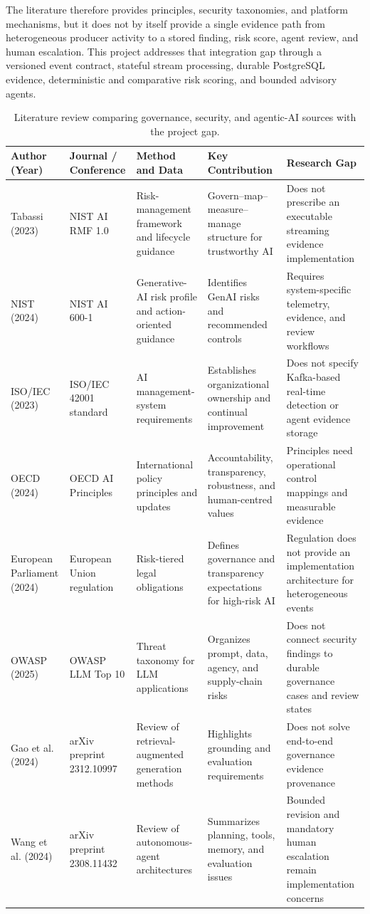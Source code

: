 \documentclass[12pt,oneside]{report}
\begin{document}
The literature therefore provides principles, security taxonomies, and platform mechanisms, but it does not by itself provide a single evidence path from heterogeneous producer activity to a stored finding, risk score, agent review, and human escalation. This project addresses that integration gap through a versioned event contract, stateful stream processing, durable PostgreSQL evidence, deterministic and comparative risk scoring, and bounded advisory agents.
\begin{table}[H]\centering\scriptsize\begin{tabular}{|p{2.2cm}|p{2.1cm}|p{2.35cm}|p{2.55cm}|p{2.35cm}|}\hline
\textbf{Author (Year)} & \textbf{Journal / Conference} & \textbf{Method and Data} & \textbf{Key Contribution} & \textbf{Research Gap}\\\hline
Tabassi (2023) \cite{nist2023} & NIST AI RMF 1.0 & Risk-management framework and lifecycle guidance & Govern--map--measure--manage structure for trustworthy AI & Does not prescribe an executable streaming evidence implementation\\\hline
NIST (2024) \cite{nistgenai2024} & NIST AI 600-1 & Generative-AI risk profile and action-oriented guidance & Identifies GenAI risks and recommended controls & Requires system-specific telemetry, evidence, and review workflows\\\hline
ISO/IEC (2023) \cite{iso42001} & ISO/IEC 42001 standard & AI management-system requirements & Establishes organizational ownership and continual improvement & Does not specify Kafka-based real-time detection or agent evidence storage\\\hline
OECD (2024) \cite{oecd2024} & OECD AI Principles & International policy principles and updates & Accountability, transparency, robustness, and human-centred values & Principles need operational control mappings and measurable evidence\\\hline
European Parliament (2024) \cite{euaiact2024} & European Union regulation & Risk-tiered legal obligations & Defines governance and transparency expectations for high-risk AI & Regulation does not provide an implementation architecture for heterogeneous events\\\hline
OWASP (2025) \cite{owasllm2025} & OWASP LLM Top 10 & Threat taxonomy for LLM applications & Organizes prompt, data, agency, and supply-chain risks & Does not connect security findings to durable governance cases and review states\\\hline
Gao et al. (2024) \cite{ragsurvey2024} & arXiv preprint 2312.10997 & Review of retrieval-augmented generation methods & Highlights grounding and evaluation requirements & Does not solve end-to-end governance evidence provenance\\\hline
Wang et al. (2024) \cite{agentsurvey2024} & arXiv preprint 2308.11432 & Review of autonomous-agent architectures & Summarizes planning, tools, memory, and evaluation issues & Bounded revision and mandatory human escalation remain implementation concerns\\\hline
\end{tabular}\caption{Literature review comparing governance, security, and agentic-AI sources with the project gap.}\label{tab:literature-review}\end{table}
\end{document}
